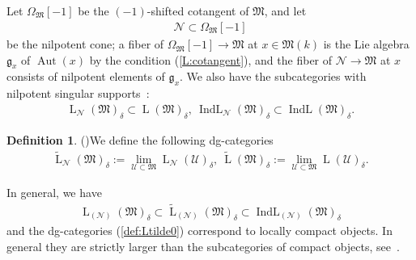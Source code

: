 \documentclass[11pt,oneside,a4paper,mathscr]{amsart}
\theoremstyle{definition}
\newtheorem{defn}[thm]{Definition}
\newcommand{\LL}{\operatorname{L}}
\newcommand{\Aut}{\operatorname{Aut}}
\newcommand{\IndL}{\operatorname{IndL}}
\begin{document}
Let $\Omega_{\mathfrak{M}}[-1]$ be the $(-1)$-shifted cotangent of $\mathfrak{M}$, and 
let 
\begin{align}\label{nilp:cone}
    \mathcal{N} \subset \Omega_{\mathfrak{M}}[-1]
\end{align}
be the nilpotent cone; a fiber of $\Omega_{\mathfrak{M}}[-1] \to \mathfrak{M}$
at $x \in \mathfrak{M}(k)$ is the Lie algebra $\mathfrak{g}_x$ of $\Aut(x)$ by the condition (\ref{L:cotangent}),
and the fiber of $\mathcal{N} \to \mathfrak{M}$ at $x$ consists of nilpotent elements of $\mathfrak{g}_x$. 
We also have the subcategories with nilpotent singular supports~\cite{AG}:
\begin{align*}
    \LL_{\mathcal{N}}(\mathfrak{M})_{\delta} \subset \LL(\mathfrak{M})_{\delta}, \ 
    \IndL_{\mathcal{N}}(\mathfrak{M})_{\delta} \subset \IndL(\mathfrak{M})_{\delta}.
\end{align*}

\begin{defn}(\cite[Remark~3.18]{PTlim})\label{def:Ltilde}
We define the following dg-categories 
\begin{align}\label{def:Ltilde0}
    \widetilde{\LL}_{\mathcal{N}}(\mathfrak{M})_{\delta}
    :=\lim_{\mathcal{U}\subset \mathfrak{M}}\LL_{\mathcal{N}}(\mathcal{U})_{\delta}, 
    \  \widetilde{\LL}(\mathfrak{M})_{\delta}
    :=\lim_{\mathcal{U}\subset \mathfrak{M}}\LL(\mathcal{U})_{\delta}.
\end{align}
\end{defn}

In general, we have 
\begin{align}\label{Ltilde:chain}
    \LL_{(\mathcal{N})}(\mathfrak{M})_{\delta} \subset \widetilde{\LL}_{(\mathcal{N})}(\mathfrak{M})_{\delta} \subset \IndL_{(\mathcal{N})}(\mathfrak{M})_{\delta}
\end{align}
and the dg-categories (\ref{def:Ltilde0}) correspond to locally compact objects. 
In general 
they are strictly larger than the subcategories of compact objects, see~\cite[Remark~3.18]{PTlim}.
\end{document}
